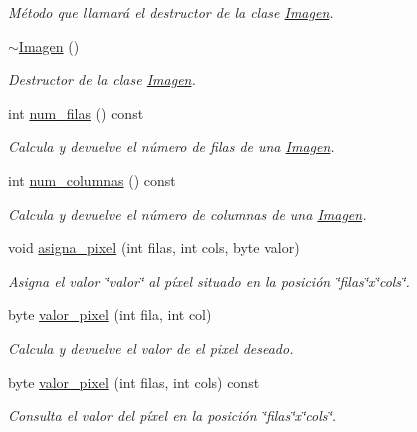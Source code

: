 \begin{DoxyCompactItemize}
\begin{DoxyCompactList}\small\item\em Método que llamará el destructor de la clase \hyperlink{classImagen}{Imagen}. \end{DoxyCompactList}\item 
\hyperlink{classImagen_a03dd93c9cf920a9dc0b72f8bd34f2e8a}{$\sim$\+Imagen} ()
\begin{DoxyCompactList}\small\item\em Destructor de la clase \hyperlink{classImagen}{Imagen}. \end{DoxyCompactList}\item 
int \hyperlink{classImagen_a4cb4faa04f5e2913965e43a6a65acfd1}{num\+\_\+filas} () const
\begin{DoxyCompactList}\small\item\em Calcula y devuelve el número de filas de una \hyperlink{classImagen}{Imagen}. \end{DoxyCompactList}\item 
int \hyperlink{classImagen_ac28d55c18064aea2a65e6fcf51d86191}{num\+\_\+columnas} () const
\begin{DoxyCompactList}\small\item\em Calcula y devuelve el número de columnas de una \hyperlink{classImagen}{Imagen}. \end{DoxyCompactList}\item 
void \hyperlink{classImagen_a3831ed1e6fc85a192a0122eaa31e54cb}{asigna\+\_\+pixel} (int filas, int cols, byte valor)
\begin{DoxyCompactList}\small\item\em Asigna el valor \char`\"{}valor\char`\"{} al píxel situado en la posición \char`\"{}filas\char`\"{}x\char`\"{}cols\char`\"{}. \end{DoxyCompactList}\item 
byte \hyperlink{classImagen_ae9488d0675cba4a9c7676aa738deeabe}{valor\+\_\+pixel} (int fila, int col)
\begin{DoxyCompactList}\small\item\em Calcula y devuelve el valor de el pixel deseado. \end{DoxyCompactList}\item 
byte \hyperlink{classImagen_a56724e20c166cb7f5c5300873cdd16ff}{valor\+\_\+pixel} (int filas, int cols) const
\begin{DoxyCompactList}\small\item\em Consulta el valor del píxel en la posición \char`\"{}filas\char`\"{}x\char`\"{}cols\char`\"{}. \end{DoxyCompactList}\item 

\end{DoxyCompactItemize}
